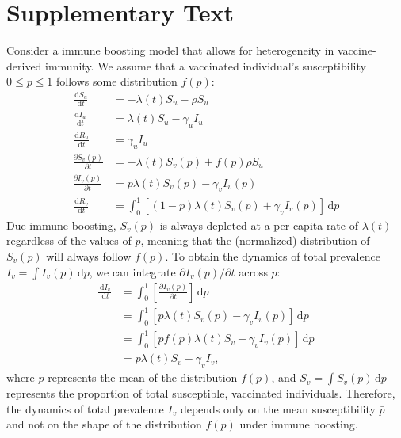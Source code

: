\documentclass[12pt]{article}
\newcommand{\dd}[1]{\ensuremath{\, \mathrm{d}#1}}
\begin{document}
\pagebreak

\section*{Supplementary Text}


Consider a immune boosting model that allows for heterogeneity in vaccine-derived immunity.
We assume that a vaccinated individual's susceptibility $0 \leq p \leq 1$ follows some distribution $f(p)$:
\begin{align}
\frac{\dd S_u}{\dd t} &= - \lambda(t) S_u - \rho S_u \\
\frac{\dd I_u}{\dd t} &= \lambda(t) S_u - \gamma_u I_u \\
\frac{\dd R_u}{\dd t} &= \gamma_u I_u \\
\frac{\partial S_v(p)}{\partial t} &= - \lambda(t) S_v(p) + f(p) \rho S_u  \\
\frac{\partial I_v(p)}{\partial t} &= p \lambda(t) S_v(p) - \gamma_v I_v(p) \\
\frac{\dd R_v}{\dd t} &= \int_0^1 \left[ (1-p) \lambda(t) S_v(p) + \gamma_v I_v(p) \right]\dd p
\end{align}
Due immune boosting, $S_v(p)$ is always depleted at a per-capita rate of $\lambda(t)$ regardless of the values of $p$, meaning that the (normalized) distribution of $S_v(p)$ will always follow $f(p)$.
To obtain the dynamics of total prevalence $I_v = \int I_v(p) \dd p$, we can integrate $\partial I_v(p)/\partial t$ across $p$:
\begin{align}
\frac{\dd I_v}{\dd t} &=  \int_0^1\left[\frac{\partial I_v(p)}{\partial t}\right]\dd p\\
&= \int_0^1\left[p \lambda(t) S_v(p) - \gamma_v I_v(p)\right]\dd p\\
&= \int_0^1\left[p f(p) \lambda(t) S_v - \gamma_v I_v(p)\right]\dd p\\
&= \bar{p} \lambda(t) S_v - \gamma_v I_v,
\end{align}
where $\bar{p}$ represents the mean of the distribution $f(p)$, and $S_v = \int S_v(p) \dd p$ represents the proportion of total susceptible, vaccinated individuals.
Therefore, the dynamics of total prevalence $I_v$ depends only on the mean susceptibility $\bar{p}$ and not on the shape of the distribution $f(p)$ under immune boosting.

\pagebreak


\end{document}
